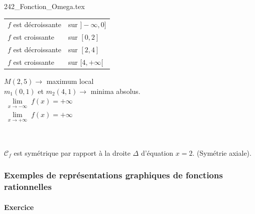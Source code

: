  {242_Fonction_Omega.tex}\hspace{1cm}%

\bigskip 

\begin{minipage}{.4\textwidth}%
       \begin{tabular}{l@{$\quad$}l}
        $f$ est décroissante & sur $]-\infty, 0]$\\ 
        $f$ est croissante   & sur $[0, 2]$\\
        $f$ est décroissante & sur $[2,4]$\\
        $f$ est croissante   & sur $[4,+\infty[$\\    
       \end{tabular}
      
      $M(2,5) \longrightarrow $ maximum local \\
      $m_1(0,1)$ et $m_2(4,1) \longrightarrow $ minima absolus.\\
      
      
      $\lim\limits_{\substack{x \to -\infty}} f(x) = +\infty $ \\

      $\lim\limits_{\substack{x \to +\infty}} f(x) = +\infty $ \\
     
 \begin{center}      
 
\\
\end{center} 
       \end{minipage}
       
\bigskip 

$\mathscr{C}_f$ est symétrique par rapport à la droite $\Delta$ d'équation $x=2$. (Symétrie axiale). 

\newpage

\subsubsection{Exemples de représentations graphiques de fonctions rationnelles}


\paragraph{Exercice }~\\

